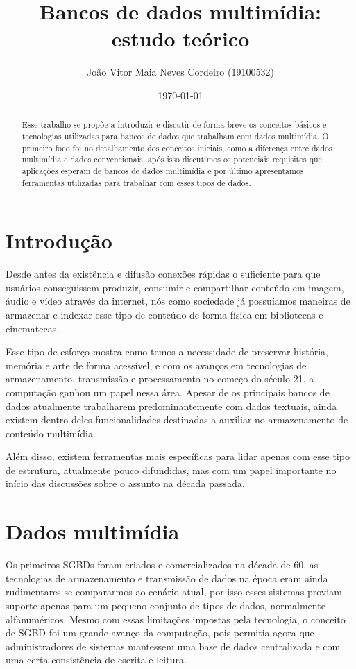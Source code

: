 \documentclass[12pt]{article}
\author{João Vitor Maia Neves Cordeiro (19100532)}
\title{Bancos de dados multimídia: estudo teórico}
\date{\today}
\begin{document}
\maketitle

\begin{abstract}

Esse trabalho se propõe a introduzir e discutir de forma breve os conceitos básicos e tecnologias utilizadas para bancos de dados que trabalham com dados multimídia.
O primeiro foco foi no detalhamento dos conceitos iniciais, como a diferença entre dados multimídia e dados convencionais, após isso discutimos os potenciais requisitos que aplicações esperam de bancos de dados multimídia e por último apresentamos ferramentas utilizadas para trabalhar com esses tipos de dados.

\end{abstract}

\section{Introdução}

Desde antes da existência e difusão conexões rápidas o suficiente para que usuários conseguissem produzir, consumir e compartilhar conteúdo em imagem, áudio e vídeo através da internet, nós como sociedade já possuíamos maneiras de armazenar e indexar esse tipo de conteúdo de forma física em bibliotecas e cinematecas.

Esse tipo de esforço mostra como temos a necessidade de preservar história, memória e arte de forma acessível, e com os avanços em tecnologias de armazenamento, transmissão e processamento no começo do século 21, a computação ganhou um papel nessa área. Apesar de os principais bancos de dados atualmente trabalharem predominantemente com dados textuais, ainda existem dentro deles funcionalidades destinadas a auxiliar no armazenamento de conteúdo multimídia.

Além disso, existem ferramentas mais específicas para lidar apenas com esse tipo de estrutura, atualmente pouco difundidas, mas com um papel importante no início das discussões sobre o assunto na década passada.

\section{Dados multimídia}

Os primeiros SGBDs foram criados e comercializados na década de 60, as tecnologias de armazenamento e transmissão de dados na época eram ainda rudimentares se compararmos ao cenário atual, por isso esses sistemas proviam suporte apenas para um pequeno conjunto de tipos de dados, normalmente alfanuméricos. 
Mesmo com essas limitações impostas pela tecnologia, o conceito de SGBD foi um grande avanço da computação, pois permitia agora que administradores de sistemas mantessem uma base de dados centralizada e com uma certa consistência de escrita e leitura. 
\end{document}
